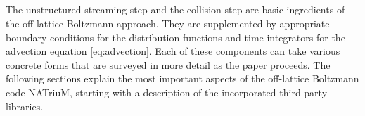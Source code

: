 \documentclass[1p, sort&compress]{elsarticle}
\providecommand{\DIFdeltex}[1]{{\protect\color{red}\sout{#1}}}                      %
\providecommand{\DIFdelbegin}{} %
\providecommand{\DIFdelend}{} %
\providecommand{\DIFdel}[1]{\texorpdfstring{\DIFdeltex{#1}}{}} %
\newcommand{\DIFscaledelfig}{0.5}
\newlength{\DIFdelgraphicswidth} %
\newlength{\DIFdelgraphicsheight} %
\newcommand{\DIFdelincludegraphics}[2][]{%
\sbox{\DIFdelgraphicsbox}{\DIFOincludegraphics[#1]{#2}}%
\settoboxwidth{\DIFdelgraphicswidth}{\DIFdelgraphicsbox} %
\settoboxtotalheight{\DIFdelgraphicsheight}{\DIFdelgraphicsbox} %
\scalebox{\DIFscaledelfig}{%
\parbox[b]{\DIFdelgraphicswidth}{\usebox{\DIFdelgraphicsbox}\\[-\baselineskip] \rule{\DIFdelgraphicswidth}{0em}}\llap{\resizebox{\DIFdelgraphicswidth}{\DIFdelgraphicsheight}{%
\setlength{\unitlength}{\DIFdelgraphicswidth}%
\begin{picture}(1,1)%
\thicklines\linethickness{2pt} %
{\color[rgb]{1,0,0}\put(0,0){\framebox(1,1){}}}%
{\color[rgb]{1,0,0}\put(0,0){\line( 1,1){1}}}%
{\color[rgb]{1,0,0}\put(0,1){\line(1,-1){1}}}%
\end{picture}%
}\hspace*{3pt}}} %
} %
\DeclareRobustCommand{\DIFdelbegin}{\DIFOdelbegin \let\includegraphics\DIFdelincludegraphics} %
\DeclareRobustCommand{\DIFdelend}{\DIFOaddend \let\includegraphics\DIFOincludegraphics} %
\begin{document}
\subsection*{}
The unstructured streaming step and the collision step are basic ingredients of the off-lattice Boltzmann approach. They are supplemented by appropriate boundary conditions for the distribution functions and time integrators for the advection equation \eqref{eq:advection}. Each of these components can take various \DIFdelbegin \DIFdel{concrete }\DIFdelend forms that are surveyed in more detail as the paper proceeds. The following sections explain the most important aspects of the off-lattice Boltzmann code NATriuM, starting with a description of the incorporated third-party libraries.

%
\end{document}
